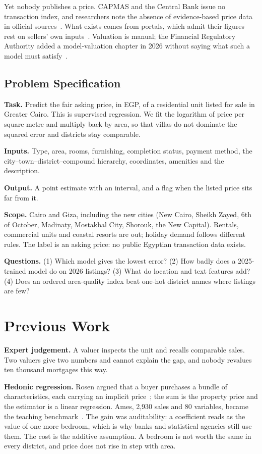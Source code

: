 \documentclass[sigconf,nonacm,10pt]{acmart}
\begin{document}
Yet nobody publishes a price. CAPMAS and the Central Bank issue no transaction index, and researchers note the absence of evidence-based price data in official sources~\cite{elkhishin2022}. What exists comes from portals, which admit their figures rest on sellers' own inputs~\cite{aqarmap2025trends}. Valuation is manual; the Financial Regulatory Authority added a model-valuation chapter in 2026 without saying what such a model must satisfy~\cite{enterprise2026valuers,dne2026fra}.

\subsection{Problem Specification}
\textbf{Task.} Predict the fair asking price, in EGP, of a residential unit listed for sale in Greater Cairo. This is supervised regression. We fit the logarithm of price per square metre and multiply back by area, so that villas do not dominate the squared error and districts stay comparable.

\textbf{Inputs.} Type, area, rooms, furnishing, completion status, payment method, the city--town--district--compound hierarchy, coordinates, amenities and the description.

\textbf{Output.} A point estimate with an interval, and a flag when the listed price sits far from it.

\textbf{Scope.} Cairo and Giza, including the new cities (New Cairo, Sheikh Zayed, 6th of October, Madinaty, Mostakbal City, Shorouk, the New Capital). Rentals, commercial units and coastal resorts are out; holiday demand follows different rules. The label is an asking price: no public Egyptian transaction data exists.

\textbf{Questions.} (1) Which model gives the lowest error? (2) How badly does a 2025-trained model do on 2026 listings? (3) What do location and text features add? (4) Does an ordered area-quality index beat one-hot district names where listings are few?

\section{Previous Work}

\textbf{Expert judgement.} A valuer inspects the unit and recalls comparable sales. Two valuers give two numbers and cannot explain the gap, and nobody revalues ten thousand mortgages this way.

\textbf{Hedonic regression.} Rosen argued that a buyer purchases a bundle of characteristics, each carrying an implicit price~\cite{rosen1974hedonic}; the sum is the property price and the estimator is a linear regression. Ames, 2,930 sales and 80 variables, became the teaching benchmark~\cite{decock2011ames}. The gain was auditability: a coefficient reads as the value of one more bedroom, which is why banks and statistical agencies still use them. The cost is the additive assumption. A bedroom is not worth the same in every district, and price does not rise in step with area.
\end{document}
